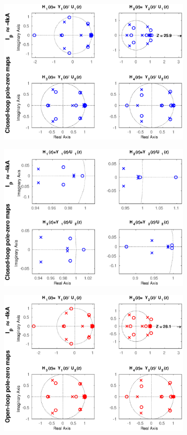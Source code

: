 \begin{figure}
	\centering
	\includegraphics[width=0.85\textwidth]{Chp5/PoleZero/PoleZeroCloseNeg.eps}
	\label{PoleZeroCloseNeg}
\end{figure}	

\begin{figure}
	\centering
	\includegraphics[width=0.85\textwidth]{Chp5/PoleZero/PoleZeroCloseNegZoom.eps}
	\label{PoleZeroCloseNegZoom}
\end{figure}	


\begin{figure}
	\centering
	\includegraphics[width=0.85\textwidth]{Chp5/PoleZero/PoleZeroOpenNeg.eps}
	\label{PoleZeroOpenNeg}
\end{figure}	

